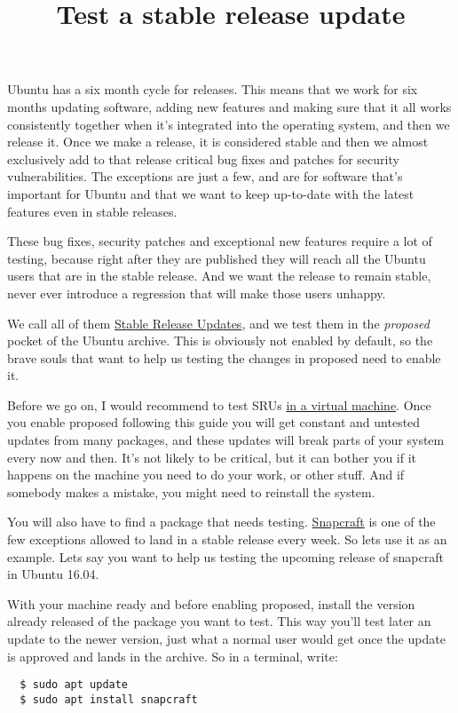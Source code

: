 \documentclass[12pt]{article}
\title{Test a stable release update}
\begin{document}
Ubuntu has a six month cycle for releases. This means that we work for six
months updating software, adding new features and making sure that it all works
consistently together when it's integrated into the operating system, and then
we release it. Once we make a release, it is considered stable and then we
almost exclusively add to that release critical bug fixes and patches for security
vulnerabilities. The exceptions are just a few, and are for software that's
important for Ubuntu and that we want to keep up-to-date with the latest
features even in stable releases.

These bug fixes, security patches and exceptional new features require a lot of
testing, because right after they are published they will reach all the Ubuntu
users that are in the stable release. And we want the release to remain stable,
never ever introduce a regression that will make those users unhappy.

We call all of them
\href{https://wiki.ubuntu.com/StableReleaseUpdates}{Stable Release Updates},
and we test them in the \emph{proposed} pocket of the Ubuntu archive. This is
obviously not enabled by default, so the brave souls that want to help us
testing the changes in proposed need to enable it.

Before we go on, I would recommend to test SRUs
\href{http://elopio.net/blog/install-ubuntu-in-vm/}
     {in a virtual machine}.
Once you enable proposed following this guide you will get constant and untested
updates from many packages, and these updates will break parts of your system
every now and then. It's not likely to be critical, but it can bother you if it
happens on the machine you need to do your work, or other stuff. And if
somebody makes a mistake, you might need to reinstall the system.

You will also have to find a package that needs testing.
\href{http://snapcraft.io}{Snapcraft} is one of the few exceptions allowed to
land in a stable release every week. So lets use it as an example. Lets say you
want to help us testing the upcoming release of snapcraft in Ubuntu 16.04.

With your machine ready and before enabling proposed, install the version
already released of the package you want to test. This way you'll test later an
update to the newer version, just what a normal user would get once the update
is approved and lands in the archive. So in a terminal, write:

\begin{verbatim}
  $ sudo apt update
  $ sudo apt install snapcraft
\end{verbatim}
\end{document}
